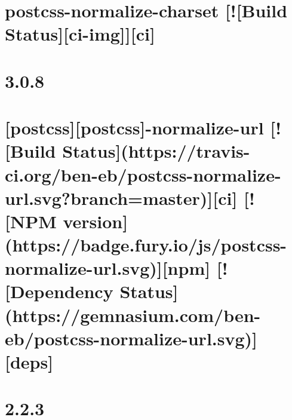 \documentclass[twoside]{book}
\newcommand{\+}{\discretionary{\mbox{\scriptsize$\hookleftarrow$}}{}{}}
\begin{document}
\chapter{postcss-\/normalize-\/charset \mbox{[}!\mbox{[}Build Status\mbox{]}\mbox{[}ci-\/img\mbox{]}\mbox{]}\mbox{[}ci\mbox{]}}
\label{md__c_1_workspace_demo_src_main_script_node_modules_postcss-normalize-charset__r_e_a_d_m_e}

\chapter{3.0.8}
\label{md__c_1_workspace_demo_src_main_script_node_modules_postcss-normalize-url__c_h_a_n_g_e_l_o_g}

\chapter{\mbox{[}postcss\mbox{]}\mbox{[}postcss\mbox{]}-\/normalize-\/url \mbox{[}!\mbox{[}Build Status\mbox{]}(https\+://travis-\/ci.org/ben-\/eb/postcss-\/normalize-\/url.svg?branch=master)\mbox{]}\mbox{[}ci\mbox{]} \mbox{[}!\mbox{[}N\+PM version\mbox{]}(https\+://badge.fury.\+io/js/postcss-\/normalize-\/url.svg)\mbox{]}\mbox{[}npm\mbox{]} \mbox{[}!\mbox{[}Dependency Status\mbox{]}(https\+://gemnasium.com/ben-\/eb/postcss-\/normalize-\/url.svg)\mbox{]}\mbox{[}deps\mbox{]}}
\label{md__c_1_workspace_demo_src_main_script_node_modules_postcss-normalize-url__r_e_a_d_m_e}

\chapter{2.2.3}
\label{md__c_1_workspace_demo_src_main_script_node_modules_postcss-ordered-values__c_h_a_n_g_e_l_o_g}

\end{document}

